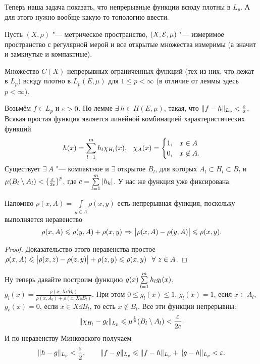 Теперь наша задача показать, что непрерывные функции всюду плотны в $L_p$. А для этого нужно вообще какую-то топологию ввести.

Пусть $(X,\rho)$ "--- метрическое пространство, $(X,\mathcal E,\mu)$ "--- измеримое пространство с регулярной мерой и все открытые множества измеримы (а значит и замкнутые и компактные).

\begin{The}
  Множество $C(X)$ непрерывных ограниченных функций (тех из них, что лежат в $L_p$) всюду плотно в $L_p(E,\mu)$ для $1\le p<\infty$ (в отличие от леммы здесь $p<\infty$).
\end{The}

\begin{Proof}
  Возьмём $f\in L_p$ и $\varepsilon>0$. По лемме $\exists\ h\in H(E,\mu)$, такая, что $\|f-h\|_{L_p}<\frac{\varepsilon}2$. Всякая простая функция является линейной комбинацией характеристических функций
\[
  h(x) = \sum\limits_{l = 1}^{m} h_l\chi_{H_l}(x),\hskip .75em plus.1em minus.08em\relax \chi_A(x) = \begin{cases}1,&x\in A\\0,&x\not\in A.\end{cases}
\]
Существует $\exists\ A$ "--- компактное и $\exists$ открытое $B_l$, для которых $A_l\subset H_l\subset B_l$ и $\mu(B_l\setminus A_l)<\left(\frac{\varepsilon}{2c}\right)^p$, где $c = \sum\limits_{l = 1}^{m}|h_k|$. У нас же функция уже фиксирована.

Напомню $\rho(x,A) = \int\limits_{y\in A}\rho(x,y)$ есть непрерывная функция, поскольку выполняется неравенство
\[
  \rho(x,A)\leqslant \rho(y,A)+\rho(x,y) \hspace{1pt plus1pt}\Rightarrow\hspace{1pt plus1pt} \big|\rho(x,A) - \rho(y,A)\big|\leqslant \rho(x,y).
\]
\begin{proof}
Доказательство этого неравенства простое $\rho(x,A)\leqslant\big| \rho(x,z) - \rho(z,y)\big|+\rho(z,y)\leqslant \rho(x,y)\hskip .75em plus.1em minus.08em\relax \forall\ z\in A$.
\end{proof}

Ну теперь давайте построим функцию $g(x)\sum\limits_{l = 1}^{m} h_lg_l(x)$, $g_l(x) = \frac{\rho(x,X\dd B_l)}{\rho(x,A_l)+\rho(x,X\dd B_l)}$. При этом $0\le g_l(x)\le 1$, $g_l(x)=1$, есил $x\in A_l$, $g_c(x) = 0$, если $x\in X\dd B_l$, то есть $x\not\in B_l$. Все эти функции непрерывны:
\[
  \|\chi_{H_l} - g_l\|_{L_p}\leqslant \mu^{\frac1p}(B_l\setminus A_l)<\frac{\varepsilon}{2c}.
\]
И по неравенству Минковского получаем
\[
  \|h-g\|_{L_p}<\frac{\varepsilon}2,\qquad \|f-g\|_{L_p}\leqslant \|f-h\|_{L_p}+\|g-h\|_{L_p}<\varepsilon.
\]
\end{Proof}

